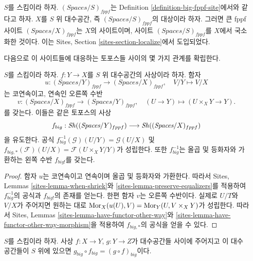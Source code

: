 \begin{definition}
\label{definition-big-small-fppf}
$S$를 스킴이라 하자. $(\textit{Spaces}/S)_{fppf}$는 Definition
\ref{definition-big-fppf-site}에서와 같다고 하자. $X$를 $S$ 위
대수공간, 즉 $(\textit{Spaces}/S)_{fppf}$의 대상이라 하자. 그러면 큰
fppf 사이트 {\it $(\textit{Spaces}/X)_{fppf}$}는 $X$의 사이트이며,
사이트 $(\textit{Spaces}/S)_{fppf}$를 $X$에서 국소화한 것이다. 이는
Sites, Section \ref{sites-section-localize}에서 도입되었다.
\end{definition}

\noindent
다음으로 이 사이트들에 대응하는 토포스들 사이의 몇 가지 관계를 확립한다.

\begin{lemma}
\label{lemma-morphism-big-fppf}
$S$를 스킴이라 하자. $f : Y \to X$를 $S$ 위 대수공간의 사상이라 하자.
함자
$$
u : (\textit{Spaces}/Y)_{fppf} \longrightarrow (\textit{Spaces}/X)_{fppf},
\quad
V/Y \longmapsto V/X
$$
는 코연속이고, 연속인 오른쪽 수반
$$
v : (\textit{Spaces}/X)_{fppf} \longrightarrow (\textit{Spaces}/Y)_{fppf},
\quad
(U \to Y) \longmapsto (U \times_X Y \to Y).
$$
를 갖는다. 이들은 같은 토포스의 사상
$$
f_{big} :
\mathop{\mathit{Sh}}\nolimits((\textit{Spaces}/Y)_{fppf})
\longrightarrow
\mathop{\mathit{Sh}}\nolimits((\textit{Spaces}/X)_{fppf})
$$
을 유도한다. 공식
$f_{big}^{-1}(\mathcal{G})(U/Y) = \mathcal{G}(U/X)$ 및
$f_{big, *}(\mathcal{F})(U/X) = \mathcal{F}(U \times_X Y/Y)$가 성립한다.
또한 $f_{big}^{-1}$는 올곱 및 등화자와 가환하는 왼쪽 수반 $f_{big!}$를
갖는다.
\end{lemma}

\begin{proof}
함자 $u$는 코연속이고 연속이며 올곱 및 등화자와 가환한다. 따라서 Sites,
Lemmas \ref{sites-lemma-when-shriek}와
\ref{sites-lemma-preserve-equalizers}를 적용하여 $f_{big}^{-1}$의 공식과
$f_{big!}$의 존재를 얻는다. 한편 함자 $v$는 오른쪽 수반이다. 실제로
$U/T$와 $V/X$가 주어지면 원하는 대로
$\mathop{\mathrm{Mor}}\nolimits_X(u(U), V) = \mathop{\mathrm{Mor}}\nolimits_Y(U, V \times_X Y)$가 성립한다.
따라서 Sites, Lemmas \ref{sites-lemma-have-functor-other-way}와
\ref{sites-lemma-have-functor-other-way-morphism}을 적용하여 $f_{big, *}$의
공식을 얻을 수 있다.
\end{proof}

\begin{lemma}
\label{lemma-composition-fppf}
$S$를 스킴이라 하자. 사상 $f : X \to Y$, $g : Y \to Z$가 대수공간들
사이에 주어지고 이 대수공간들이 $S$ 위에 있으면
$g_{big} \circ f_{big} = (g \circ f)_{big}$이다.
\end{lemma}

